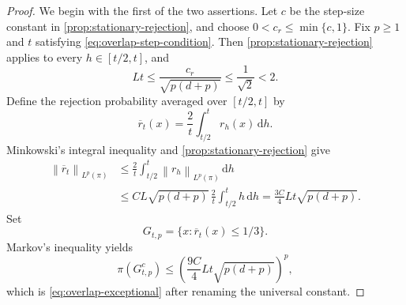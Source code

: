 \documentclass[11pt]{article}
\newcommand{\norm}[1]{\left\lVert #1\right\rVert}
\newcommand{\1}{\mathbf 1}
\newcommand{\df}{\mathrm{d}}
\begin{document}
	\begin{proof}
		We begin with the first of the two assertions.
		Let \(c\) be the step-size constant in \cref{prop:stationary-rejection},
		and choose \(0<c_r\leq\min\{c,1\}\).
		Fix $p \geq 1$ and $t$ satisfying \eqref{eq:overlap-step-condition}.
		Then \cref{prop:stationary-rejection} applies to every
		\(h\in[t/2,t]\), and
		\[
		Lt\leq\frac{c_r}{\sqrt{p(d+p)}}\leq\frac1{\sqrt2}<2.
		\]
		Define the rejection probability averaged over \([t/2,t]\) by
		\[
		\overline r_t(x)=\frac2t\int_{t/2}^t r_h(x)\,\df h.
		\]
		Minkowski's integral inequality and \cref{prop:stationary-rejection} give
		\[
		\begin{aligned}
			\norm{\overline r_t}_{L^p(\pi)}
			&\leq\frac2t\int_{t/2}^t\norm{r_h}_{L^p(\pi)}\,\df h\\
			&\leq CL\sqrt{p(d+p)}\,\frac2t\int_{t/2}^t h\,\df h
			=\frac{3C}{4}Lt\sqrt{p(d+p)}.
		\end{aligned}
		\]
		Set
		\[
		G_{t,p}=\{x:\overline r_t(x)\leq1/3\}.
		\]
		Markov's inequality yields
		\begin{equation*}
			\pi(G_{t,p}^c)
			\leq
			\left(\frac{9C}{4}Lt\sqrt{p(d+p)}\right)^p,
		\end{equation*}
		which is \eqref{eq:overlap-exceptional} after renaming the universal
		constant.
		

\end{proof}
\end{document}
